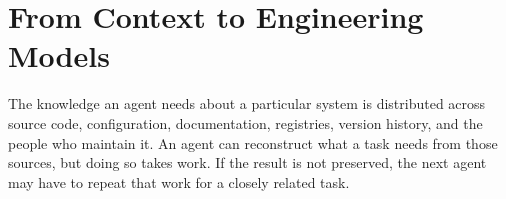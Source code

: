 


\chapter{From Context to Engineering Models}



The knowledge an agent needs about a particular system is distributed across source code, configuration, documentation, registries, version history, and the people who maintain it. An agent can reconstruct what a task needs from those sources, but doing so takes work. If the result is not preserved, the next agent may have to repeat that work for a closely related task.





